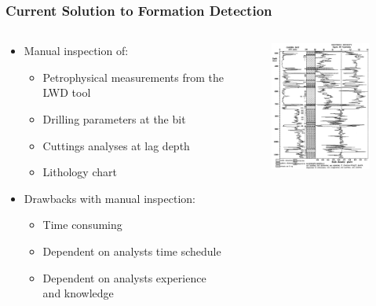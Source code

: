 \documentclass{beamer}
\begin{document}
\begin{frame} \frametitle{Current Solution to Formation Detection} 
\vspace{-1cm}
\begin{columns}[onlytextwidth]
\begin{column}{0.6\textwidth}\begin{itemize}
\item<1-> Manual inspection of: 
\begin{itemize}
\item<1-> Petrophysical measurements from the LWD tool
\item<1-> Drilling parameters at the bit
\item<1-> Cuttings analyses at lag depth
\item<1-> Lithology chart
\end{itemize}
\item<2-> Drawbacks with manual inspection: 
\begin{itemize}
\item<3-> Time consuming
\item<4-> Dependent on analysts time schedule
\item<5-> Dependent on analysts experience and knowledge
\end{itemize}
\end{itemize}
\end{column}

\begin{column}{0.4\textwidth}
\begin{figure}
\begin{center}
\includegraphics [keepaspectratio,width = 4.7cm] {lithologyGamma.png}
\end{center}
\end{figure}
\end{column}
\end{columns}
\end{frame}
\end{document}
